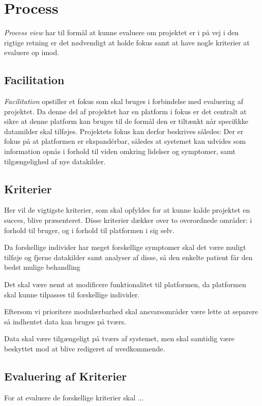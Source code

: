 \section{Process}
\emph{Process view} har til formål at kunne evaluere om projektet er i på vej i den rigtige retning er det nødvendigt at holde fokus samt at have nogle kriterier at evaluere op imod.

\subsection{Facilitation}
\emph{Facilitation} opstiller et fokus som skal bruges i forbindelse med evaluering af projektet.
Da denne del af projektet har en platform i fokus er det centralt at sikre at denne platform kan bruges til de formål den er tiltænkt når specifikke datamilder skal tilføjes.
Projektets fokus kan derfor beskrives således:
Der er fokus på at platformen er ekspandérbar, således at systemet kan udvides som information opnås i forhold til viden omkring lidelser og symptomer, samt tilgængelighed af nye datakilder.

\subsection{Kriterier}
Her vil de vigtigste kriterier, som skal opfyldes for at kunne kalde projektet en succes, blive præsenteret.
Disse kriterier dækker over to overordnede områder: i forhold til bruger, og i forhold til platformen i sig selv.

\begin{description}[style=nextline]
	\item[Modulær] Da forskellige individer har meget forskellige symptomer skal det være muligt tilføje og fjerne datakilder samt analyser af disse, så den enkelte patient får den bedst mulige behandling
	\item[Fleksibilitet]
	Det skal være nemt at modificere funktionalitet til platformen, da platformen skal kunne tilpasses til forskellige individer.
	\item[Kombinerbar] Eftersom vi prioritere modulærbarhed skal ansvarsområder være lette at separere så indhentet data kan bruges på tværs.
	\item[Kommunikation] Data skal være tilgængeligt på tværs af systemet, men skal samtidig være beskyttet mod at blive redigeret af uvedkommende.
\end{description}

\subsection{Evaluering af Kriterier}
For at evaluere de forskellige kriterier skal ...


